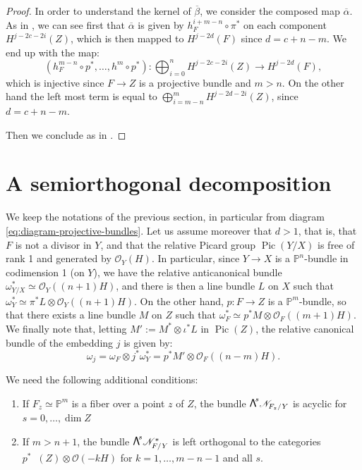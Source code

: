 \documentclass[JEP,XML,SOM,Unicode,NoEqCountersInSection]{cedram}
\newcommand\bw[1]{{\hbox{\large$\mathsf{\Lambda}$}^{\!#1}}}
\let\mathcal\mathscr
\theoremstyle{plain}
\theoremstyle{definition}
\newcommand{\cat}[1]{\mathsf{#1}}
\DeclareMathOperator{\Db}{{\cat{D}^{\mathrm{b}}}}
\DeclareMathOperator{\Pic}{Pic}
\newcommand{\PP}{\mathbb{P}}
\newcommand{\sheaf}[1]{\mathcal{#1}}
\newcommand{\kn}{\sheaf{N}}
\newcommand{\ko}{\sheaf{O}}\let\OO\ko\let\cO\ko
\renewcommand{\theenumi}{\alph{enumi}}
\begin{document}
\begin{proof}
In order to understand the kernel of $\overline{\beta}$, we consider the composed map $\overline{\alpha}$.
As in \cite[7.3.3]{voisin-book}, we
can see first that $\overline{\alpha}$ is given by $h_F^{i+m-n}\circ \pi^*$ on each component $H^{j-2c-2i}(Z)$,
which is then mapped to $H^{j-2d}(F)$ since $d=c+n-m$.
We end up with the map:
\[
(h_F^{m-n}\circ p^*,\ldots,h^m \circ p^*): \bigoplus_{i=0}^n H^{j-2c-2i}(Z) \to H^{j-2d}(F),
\]
which is injective since $F \to Z$ is a projective bundle and $m > n$. On the other hand the left most term is equal to $\bigoplus_{i=m-n}^m H^{j-2d-2i}(Z)$, since $d=c+n-m$.

Then we conclude as in \cite[7.3.3]{voisin-book}.
\end{proof}

\section{A semiorthogonal decomposition}\label{sect:appendix-A}

We keep the notations of the previous section, in particular from diagram \eqref{eq:diagram-projective-bundles}.
Let us assume moreover that $d>1$, that is, that $F$ is not a divisor in $Y$, and that the relative Picard
group $\Pic(Y/X)$ is free of rank 1 and generated by $\ko_Y(H)$. In particular, since $Y \to X$ is a $\PP^n$-bundle
in codimension 1 (on $Y$), we have the relative anticanonical bundle $\omega^*_{Y/X} \simeq \ko_Y((n+1)H)$,
and there is then a line bundle $L$ on $X$ such that $\omega^*_Y \simeq \pi^* L\otimes \ko_Y((n+1)H)$.
On the other hand, $p: F \to Z$ is a $\PP^m$-bundle, so that there exists a line bundle $M$ on $Z$
such that $\omega_F^* \simeq p^* M \otimes \ko_F((m+1)H)$. We finally note that, letting $M':=M^* \otimes \iota^* L$ in $\Pic(Z)$,
the relative canonical bundle of the embedding $j$ is given by:
\[
\omega_j = \omega_F \otimes j^*\omega_Y^* = p^*M' \otimes \ko_F((n-m)H).
\]

We need the following additional conditions:

\begin{enumerate}\renewcommand{\theenumi}{C\arabic{enumi}}
\item\label{C1}
If $F_z \simeq \PP^m$ is a fiber over a point $z$ of $Z$,
the bundle $\bw{s} \kn_{F_z/Y}$ is acyclic for $s=0,\ldots,\dim Z$
\item\label{C2}
If $m > n+1$, the bundle $\bw{s} \kn^*_{F/Y}$ is left orthogonal to the categories
$p^* \Db(Z) \otimes \ko(-kH)$ for $k=1,\ldots,m-n-1$ and all $s$.
\end{enumerate}
\end{document}
